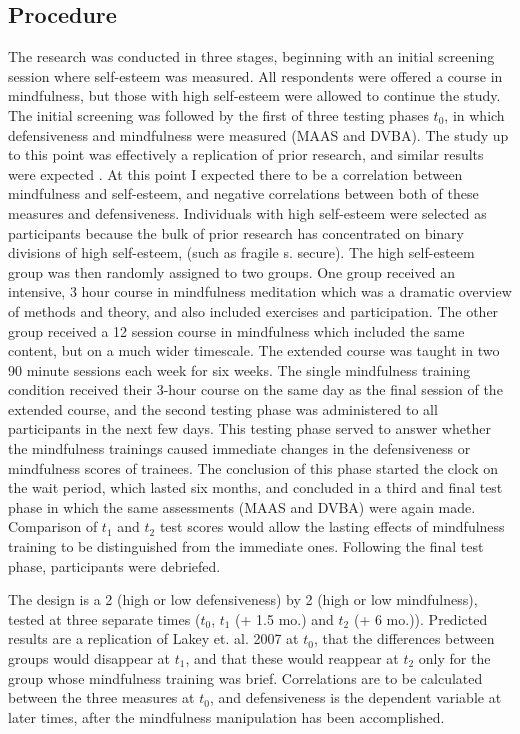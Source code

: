 \documentclass[jou]{apa}
\begin{document}
\subsection{Procedure}
The research was conducted in three stages, beginning with an initial screening session where self-esteem was measured.  All respondents were offered a course in mindfulness, but those with high self-esteem were allowed to continue the study. The initial screening was followed by the first of three testing phases $t_0$, in which defensiveness and mindfulness were measured (MAAS and DVBA).  The study up to this point was effectively a replication of prior research, and similar results were expected \cite{lakey2008}.  At this point I expected there to be a correlation between mindfulness and self-esteem, and negative correlations between both of these measures and defensiveness.  Individuals with high self-esteem were selected as participants because the bulk of prior research has concentrated on binary divisions of high self-esteem, (such as fragile s. secure).  The high self-esteem group was then randomly assigned to two groups.  One group received an intensive, 3 hour course in mindfulness meditation which was a dramatic overview of methods and theory, and also included exercises and participation.  The other group received a 12 session course in mindfulness which included the same content, but on a much wider timescale.  The extended course was taught in two 90 minute sessions each week for six weeks.  The single mindfulness training condition received their 3-hour course on the same day as the final session of the extended course, and the second testing phase was administered to all participants in the next few days.  This testing phase served to answer whether the mindfulness trainings caused immediate changes in the defensiveness or mindfulness scores of trainees.  The conclusion of this phase started the clock on the wait period, which lasted six months, and concluded in a third and final test phase in which the same assessments (MAAS and DVBA) were again made.  Comparison of $t_1$ and $t_2$ test scores would allow the lasting effects of mindfulness training to be distinguished from the immediate ones.  Following the final test phase, participants were debriefed.

The design is a 2 (high or low defensiveness) by 2 (high or low mindfulness), tested at three separate times ($t_0$, $t_1$ (+ 1.5 mo.) and $t_2$ (+ 6 mo.)).  Predicted results are a replication of Lakey et. al. 2007 at $t_0$, that the differences between groups would disappear at $t_1$, and that these would reappear at $t_2$ only for the group whose mindfulness training was brief.   Correlations are to be calculated between the three measures at $t_0$, and defensiveness is the dependent variable at later times, after the mindfulness manipulation has been accomplished.  
\end{document}
